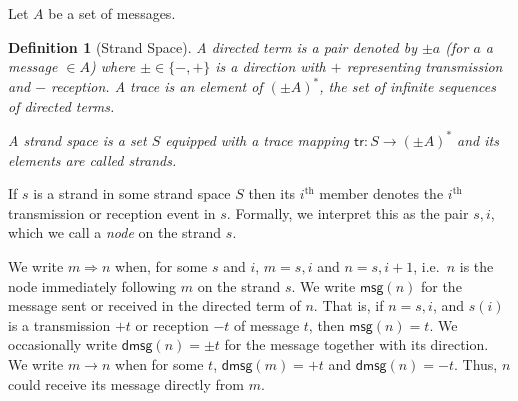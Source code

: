 \documentclass[copyright]{eptcs}
\newcommand{\msg}[1]{\mathsf{msg}(#1)}
\newcommand{\dmsg}[1]{\mathsf{dmsg}(#1)}
\newcommand{\NI}{\noindent}
\newtheorem{definition}{Definition}
\begin{document}
Let $A$ be a set of messages.
\begin{definition}[Strand Space]
  A {\em directed term} is a pair denoted by $\pm a$ (for $a$ a
  message $\in A$) where $\pm\in\{-,+\}$ is a direction with $+$
  representing transmission and $-$ reception.  A trace is an element
  of $(\pm A)^*$, the set of infinite sequences of directed terms.

  \NI A {\em strand space} is a set $S$ equipped with a trace mapping
  $\mathsf{tr}:S\rightarrow(\pm A)^*$ and its elements are called {\em
    strands}.
\end{definition}
\NI If $s$ is a strand in some strand space $S$ then its
$i^{\mathrm{th}}$ member denotes the $i^{\mathrm{th}}$ transmission or
reception event in $s$.  Formally, we interpret this as the pair
$s,i$, which we call a \emph{node} on the strand $s$.  

We write $m\Rightarrow n$ when, for some $s$ and $i$, $m=s,i$ and
$n=s,i+1$, i.e.~$n$ is the node immediately following $m$ on the
strand $s$.  We write $\msg n$ for the message sent or received in the
directed term of $n$.  That is, if $n=s,i$, and $s(i)$ is a
transmission $+t$ or reception $-t$ of message $t$, then $\msg n=t$.
We occasionally write $\dmsg n=\pm t$ for the message together with
its direction.  We write $m\rightarrow n$ when for some $t$, $\dmsg
m=+t$ and $\dmsg n=-t$.  Thus, $n$ could receive its message directly
from $m$.  

\smallskip
\end{document}
